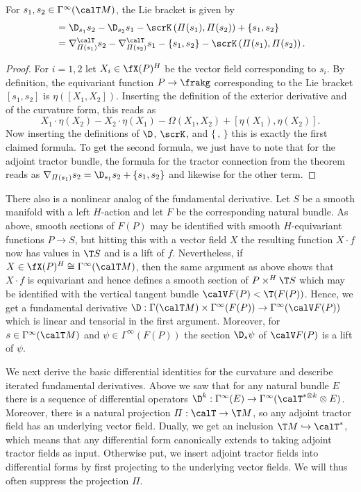  \begin{cor}\label{cor 1.5.8 Cap}
    For $s_1,s_2\in\Gamma^\infty(\calT M)$, the Lie bracket is given by 
    \begin{align}
        [s_1,s_2]&=\D_{s_1}s_2-\D_{s_2}s_1 -\scrK\left(\varPi(s_1),\varPi(s_2)\right)+\{s_1,s_2\}\\
        &=\nabla^{\calT}_{\varPi(s_1)}s_2-\nabla^\calT_{\varPi(s_2)}s_1-\{s_1,s_2\}-\scrK\left(\varPi(s_1),\varPi(s_2)\right).
    \end{align}
 \end{cor}
 \begin{proof}
    For $i=1,2$ let $X_i\in\fX(P)^H$ be the vector field corresponding to $s_i$. By definition, the equivariant function $P\to\frakg$ corresponding to the Lie bracket $[s_1,s_2]$ is $\eta([X_1,X_2])$. Inserting the definition of the exterior derivative and of the curvature form, this reads as 
    \[X_1\cdot\eta(X_2)-X_2\cdot\eta(X_1)-\Omega(X_1,X_2)+[\eta(X_1),\eta(X_2)].\]
    Now inserting the definitions of $\D$, $\scrK$, and $\{\,,\,\}$ this is exactly the first claimed formula. To get the second formula, we just have to note that for the adjoint tractor bundle, the formula for the tractor connection from the theorem reads as $\nabla_{\varPi(s_1)}s_2=\D_{s_1}s_2+\{s_1,s_2\}$ and likewise for the other term.
 \end{proof}

 \begin{rem}
    There also is a nonlinear analog of the fundamental derivative. Let $S$ be a smooth manifold with a left $H$-action and let $F$ be the corresponding natural bundle. As above, smooth sections of $F(P)$ may be identified with smooth $H$-equivariant functions $P\to S$, but hitting this with a vector field $X$ the resulting function $X\cdot f$ now has values in $\T S$ and is a lift of $f$. Nevertheless, if $X\in\fX(P)^H\cong \Gamma^\infty(\calT M)$, then the same argument as above shows that $X\cdot f$ is equivariant and hence defines a smooth section of $P\times^{H} \T S$ which may be identified with the vertical tangent bundle $\calV F(P)<\T (F(P))$. Hence, we get a fundamental derivative $\D:\Gamma(\calT M)\times\Gamma^\infty(F(P))\to \Gamma^\infty(\calV F(P))$ which is linear and tensorial in the first argument. Moreover, for $s\in\Gamma^\infty(\calT M)$ and $\psi\in \Gamma^\infty(F(P))$ the section $\D_s\psi$ of $\calV F(P)$ is a lift of $\psi$.
 \end{rem}

 We next derive the basic differential identities for the curvature and describe iterated fundamental derivatives. Above we saw that for any natural bundle $E$ there is a sequence of differential operators $\D^k:\Gamma^\infty(E)\to \Gamma^\infty(\calT^{\ast\otimes k}\otimes E)$. Moreover, there is a natural projection $\varPi:\calT\to \T M$, so any adjoint tractor field has an underlying vector field. Dually, we get an inclusion $\T M\hookrightarrow \calT^\ast$, which means that any differential form canonically extends to taking adjoint tractor fields as input. Otherwise put, we insert adjoint tractor fields into differential forms by first projecting to the underlying vector fields. We will thus often suppress the projection $\varPi$.

